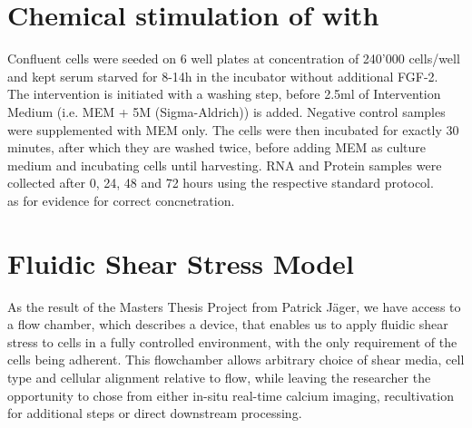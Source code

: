 \section{Chemical stimulation of \Piezo{} with \Yoda{}}
\label{sec:ChemicalStimulation}
Confluent cells were seeded on 6 well plates at concentration of 240'000 cells/well and kept serum starved for 8-14h in the incubator without additional FGF-2. \\
The intervention is initiated with a washing step, before 2.5ml of Intervention Medium (i.e. MEM\textalpha{} + 5\textmu{}M \Yoda (Sigma-Aldrich)) is added. Negative control samples were supplemented with MEM\textalpha{} only. The cells were then incubated for exactly 30 minutes, after which they are washed twice, before adding MEM\textalpha{} as culture medium and incubating cells until harvesting. RNA and Protein samples were collected after 0, 24, 48 and 72 hours using the respective standard protocol.\\ \cite{Morley2018} as for evidence for correct concnetration.

\section{Fluidic Shear Stress Model}
As the result of the Masters Thesis Project from Patrick Jäger, we have access to a flow chamber, which describes a device, that enables us to apply fluidic shear stress to cells in a fully controlled environment, with the only requirement of the cells being adherent. This flowchamber allows arbitrary choice of shear media, cell type and cellular alignment relative to flow, while leaving the researcher the opportunity to chose from either in-situ real-time calcium imaging, recultivation for additional steps or direct downstream processing.

